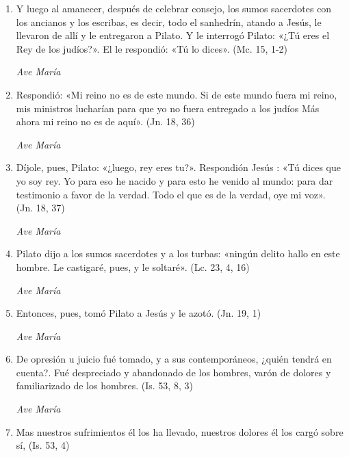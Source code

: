 \documentclass[a4paper,11pt, oneside]{report}
\begin{document}
        \begin{enumerate}
          
          \item Y luego al amanecer, después de celebrar consejo, los sumos sacerdotes con los ancianos y los escribas, es decir, todo el sanhedrín, atando a Jesús,
          le llevaron de allí y le entregaron a Pilato. Y le interrogó Pilato: «¿Tú eres el Rey de los judíos?». El le respondió: «Tú lo dices». (Mc. 15, 1-2)

          \textit{Ave María}

          \item Respondió: «Mi reino no es de este mundo. Si de este mundo fuera mi reino, mis ministros lucharían para que yo no fuera entregado a los judíos
          Más ahora mi reino no es de aquí». (Jn. 18, 36)

          \textit{Ave María}

          \item Díjole, pues, Pilato: «¿luego, rey eres tu?». Respondión Jesús : «Tú dices que yo soy rey. Yo para eso he nacido y para esto he venido
          al mundo: para dar testimonio a favor de la verdad. Todo el que es de la verdad, oye mi voz». (Jn. 18, 37)

          \textit{Ave María}

          \item Pilato dijo a los sumos sacerdotes y a los turbas: «ningún delito hallo en este hombre. 
          Le castigaré, pues, y le soltaré». (Lc. 23, 4, 16)

          \textit{Ave María}

          \item Entonces, pues, tomó Pilato a Jesús y le azotó. (Jn. 19, 1)

          \textit{Ave María}

          \item De opresión u juicio fué tomado, y a sus contemporáneos, ¿quién tendrá en cuenta?. Fué despreciado y abandonado de los hombres,
          varón de dolores y familiarizado de los hombres. (Is. 53, 8, 3)

          \textit{Ave María}

          \item Mas nuestros sufrimientos él los ha llevado, nuestros dolores él los cargó sobre sí, (Is. 53, 4)


\end{enumerate}
\end{document}
